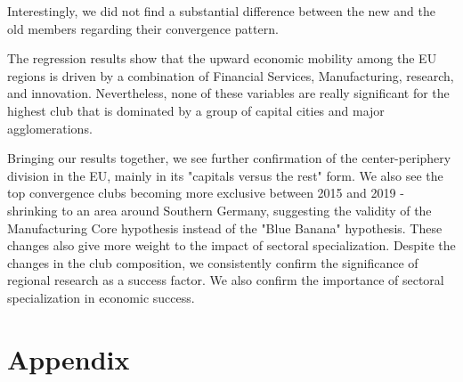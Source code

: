 \documentclass[11pt]{article}
\begin{document}
Interestingly, we did not find a substantial difference between the new and the old members regarding their convergence pattern.


The regression results show that the upward economic mobility among the EU regions is driven by a combination of Financial Services, Manufacturing, research, and innovation. Nevertheless, none of these variables are really significant for the highest club that is dominated by a group of capital cities and major agglomerations.
 
 
Bringing our results together, we see further confirmation of the center-periphery division in the EU, mainly in its "capitals versus the rest" form. We also see the top convergence clubs becoming more exclusive between 2015 and 2019 - shrinking to an area around Southern Germany, suggesting the validity of the Manufacturing Core hypothesis instead of the "Blue Banana" hypothesis. These changes also give more weight to the impact of sectoral specialization. Despite the changes in the club composition, we consistently confirm the significance of regional research as a success factor. We also confirm the importance of sectoral specialization in economic success.



\newpage



\section{Appendix}
\end{document}
